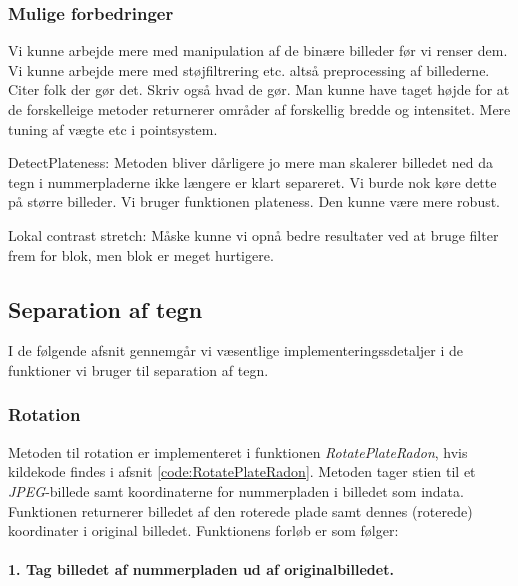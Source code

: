 \subsubsection{Mulige forbedringer}
Vi kunne arbejde mere med manipulation af de binære billeder før vi renser dem. Vi kunne arbejde mere med støjfiltrering etc. altså preprocessing af billederne. Citer folk der gør det. Skriv også hvad de gør.
Man kunne have taget højde for at de forskelleige metoder returnerer områder af forskellig bredde og intensitet.
Mere tuning af vægte etc i pointsystem.

DetectPlateness:
Metoden bliver dårligere jo mere man skalerer billedet ned da tegn i nummerpladerne ikke længere er klart separeret. Vi burde nok køre dette på større billeder.
Vi bruger funktionen plateness. Den kunne være mere robust.

Lokal contrast stretch:
Måske kunne vi opnå bedre resultater ved at bruge filter frem for blok, men blok er meget hurtigere.



\subsection{Separation af tegn}

I de følgende afsnit gennemgår vi væsentlige implementeringssdetaljer i de funktioner vi bruger til separation af tegn. 

\subsubsection{Rotation}
\label{sec:implementation/sep/rotation}

Metoden til rotation er implementeret i funktionen \textit{RotatePlateRadon}, hvis kildekode findes i afsnit \vref{code:RotatePlateRadon}. Metoden tager stien til et \textit{JPEG}-billede samt koordinaterne for nummerpladen i billedet som indata. Funktionen returnerer billedet af den roterede plade samt dennes (roterede) koordinater i original billedet. Funktionens forløb er som følger:

\paragraph{1. Tag billedet af nummerpladen ud af originalbilledet.}
